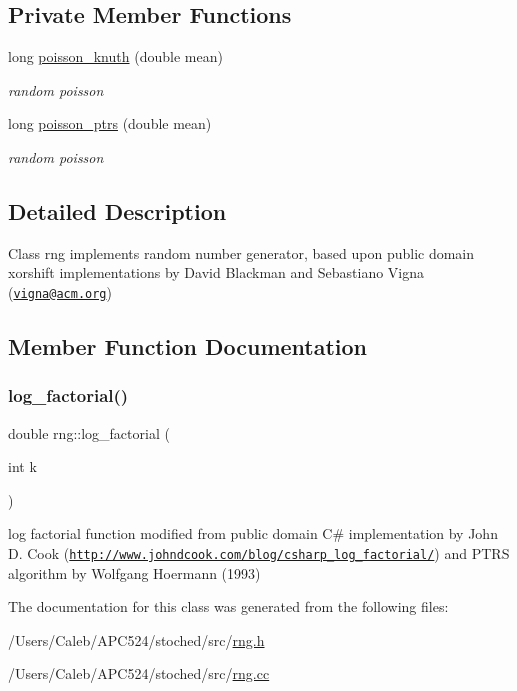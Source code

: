 \subsection*{Private Member Functions}
\begin{DoxyCompactItemize}
\item 
\mbox{\label{classrng_a1fd45ffcc5dc65bdf23311f97fd0630c}} 
long \hyperlink{classrng_a1fd45ffcc5dc65bdf23311f97fd0630c}{poisson\+\_\+knuth} (double mean)
\begin{DoxyCompactList}\small\item\em random poisson \end{DoxyCompactList}\item 
\mbox{\label{classrng_aefbbe59c0bb810de0337855e77b36747}} 
long \hyperlink{classrng_aefbbe59c0bb810de0337855e77b36747}{poisson\+\_\+ptrs} (double mean)
\begin{DoxyCompactList}\small\item\em random poisson \end{DoxyCompactList}\end{DoxyCompactItemize}


\subsection{Detailed Description}
Class rng implements random number generator, based upon public domain xorshift implementations by David Blackman and Sebastiano Vigna (\href{mailto:vigna@acm.org}{\tt vigna@acm.\+org}) 

\subsection{Member Function Documentation}
\mbox{\label{classrng_ae85750e7f1befc4d1016731248dd3e80}} 
\subsubsection{\texorpdfstring{log\+\_\+factorial()}{log\_factorial()}}
{\footnotesize\ttfamily double rng\+::log\+\_\+factorial (\begin{DoxyParamCaption}\item[{int}]{k }\end{DoxyParamCaption})}

log factorial function modified from public domain C\# implementation by John D. Cook (\href{http://www.johndcook.com/blog/csharp_log_factorial/}{\tt http\+://www.\+johndcook.\+com/blog/csharp\+\_\+log\+\_\+factorial/}) and P\+T\+RS algorithm by Wolfgang Hoermann (1993) 

The documentation for this class was generated from the following files\+:\begin{DoxyCompactItemize}
\item 
/\+Users/\+Caleb/\+A\+P\+C524/stoched/src/\hyperlink{rng_8h}{rng.\+h}\item 
/\+Users/\+Caleb/\+A\+P\+C524/stoched/src/\hyperlink{rng_8cc}{rng.\+cc}\end{DoxyCompactItemize}
